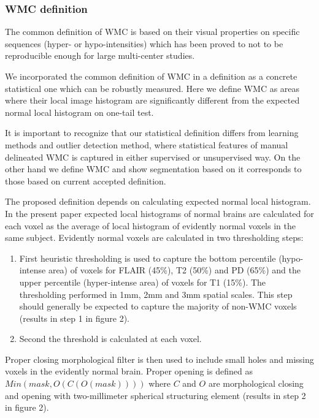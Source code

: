 \subsubsection{WMC definition}
The common definition of WMC is based on their visual properties on specific sequences (hyper- or hypo-intensities) which has been proved to not to be reproducible enough for large multi-center studies. 
\par
We incorporated the common definition of WMC in a definition as a concrete statistical one which can be robustly measured. Here we  define WMC as areas where their local image histogram are significantly different from the expected normal local histogram on one-tail test.
\par
It is important to recognize that our statistical definition differs from learning methods and outlier detection method, where statistical features of manual delineated WMC is captured in either supervised or unsupervised way.
On the other hand we define WMC and show segmentation based on it corresponds to those based on current accepted definition.
\par
The proposed definition depends on calculating expected normal local histogram. In the present paper expected local histograms of normal brains are calculated for each voxel as the average of local histogram of evidently normal voxels in the same subject. Evidently normal voxels are calculated in two thresholding steps:
\begin{enumerate}
\item First heuristic thresholding is used to capture the bottom percentile (hypo-intense area) of voxels for FLAIR (45\%), T2 (50\%) and PD (65\%) and the upper percentile (hyper-intense area) of voxels for T1 (15\%). The thresholding performed in 1mm, 2mm and 3mm spatial scales. This step should generally be expected to capture the majority of non-WMC voxels (results in step 1 in figure 2).
\item Second the threshold is calculated  \cite{ReduceSVM} at each voxel.
\end{enumerate}

Proper closing morphological filter is then used to include small holes and missing voxels in the evidently normal brain. Proper opening is defined as $ Min(mask,O( C( O( mask )))  ) $ where $ C $ and $ O $ are morphological closing and opening with two-millimeter spherical structuring element (results in step 2 in figure 2).

    
    
    
    
    
    
    
    
    
  
  
  
  